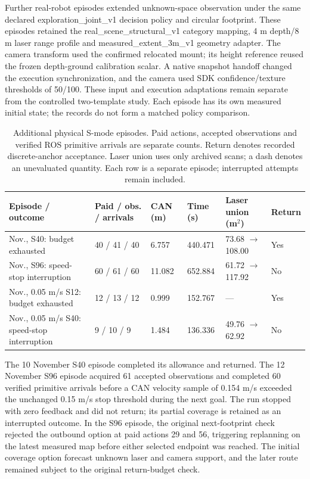 Further real-robot episodes extended unknown-space observation under the same declared exploration\_joint\_v1 decision policy and circular footprint. These episodes retained the real\_scene\_structural\_v1 category mapping, 4 m depth/8 m laser range profile and measured\_extent\_3m\_v1 geometry adapter. The camera transform used the confirmed relocated mount; its height reference reused the frozen depth-ground calibration scalar. A native snapshot handoff changed the execution synchronization, and the camera used SDK confidence/texture thresholds of 50/100. These input and execution adaptations remain separate from the controlled two-template study. Each episode has its own measured initial state; the records do not form a matched policy comparison.

\begin{table}[!htbp]
\caption{Additional physical S-mode episodes. Paid actions, accepted observations and verified ROS primitive arrivals are separate counts. Return denotes recorded discrete-anchor acceptance. Laser union uses only archived scans; a dash denotes an unevaluated quantity. Each row is a separate episode; interrupted attempts remain included.}\label{tab:physical-latest}
\small\renewcommand{\arraystretch}{1.13}\setlength{\tabcolsep}{3pt}
\begin{tabular}{@{}>{\raggedright\arraybackslash}p{.25\linewidth}p{.14\linewidth}p{.11\linewidth}p{.15\linewidth}p{.15\linewidth}p{.10\linewidth}@{}}
\toprule
Episode / outcome & Paid / obs. / arrivals & CAN (m) & Time (s) & Laser union (m$^2$) & Return \\
\midrule
10 Nov., S40: budget exhausted & 40 / 41 / 40 & 6.757 & 440.471 & 73.68 $\to$ 108.00 & Yes \\
12 Nov., S96: speed-stop interruption & 60 / 61 / 60 & 11.082 & 652.884 & 61.72 $\to$ 117.92 & No \\
12 Nov., 0.05 m/s S12: budget exhausted & 12 / 13 / 12 & 0.999 & 152.767 & --- & Yes \\
12 Nov., 0.05 m/s S40: speed-stop interruption & 9 / 10 / 9 & 1.484 & 136.336 & 49.76 $\to$ 62.92 & No \\
\bottomrule
\end{tabular}
\end{table}

The 10 November S40 episode completed its allowance and returned. The 12 November S96 episode acquired 61 accepted observations and completed 60 verified primitive arrivals before a CAN velocity sample of 0.154 m/s exceeded the unchanged 0.15 m/s stop threshold during the next goal. The run stopped with zero feedback and did not return; its partial coverage is retained as an interrupted outcome. In the S96 episode, the original next-footprint check rejected the outbound option at paid actions 29 and 56, triggering replanning on the latest measured map before either selected endpoint was reached. The initial coverage option forecast unknown laser and camera support, and the later route remained subject to the original return-budget check.

